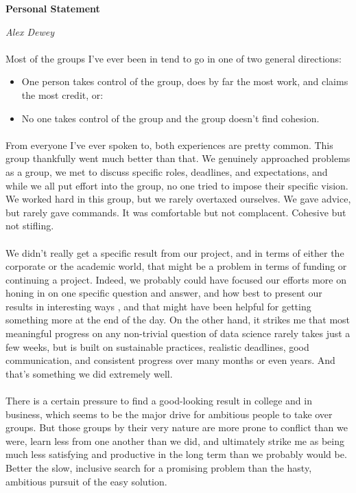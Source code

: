 \documentclass[11pt]{article} %
\begin{document}
\newpage



\textbf{Personal Statement}

\textit{Alex Dewey}

\paragraph{}Most of the groups I've ever been in tend to go in one of two general directions:

\begin{itemize}
\item One person takes control of the group, does by far the most work, and claims the most credit, or:
\item No one takes control of the group and the group doesn't find cohesion.
\end{itemize}

\paragraph{}From everyone I've ever spoken to, both experiences are pretty common. This group thankfully went much better than that. We genuinely approached problems as a group, we met to discuss specific roles, deadlines, and expectations, and while we all put effort into the group, no one tried to impose their specific vision.  We worked hard in this group, but we rarely overtaxed ourselves. We gave advice, but rarely gave commands. It was comfortable but not complacent. Cohesive but not stifling.

\paragraph{}We didn't really get a specific result from our project, and in terms of either the corporate or the academic world, that might be a problem in terms of funding or continuing a project. Indeed, we probably could have focused our efforts more on honing in on one specific question and answer, and how best to present our results in interesting ways , and that might have been helpful for getting something more at the end of the day. On the other hand, it strikes me that most meaningful progress on any non-trivial question of data science rarely takes just a few weeks, but is built on sustainable practices, realistic deadlines, good communication, and consistent progress over many months or even years. And that's something we did extremely well.

\paragraph{}There is a certain pressure to find a good-looking result in college and in business, which seems to be the major drive for ambitious people to take over groups. But those groups by their very nature are more prone to conflict than we were, learn less from one another than we did, and ultimately strike me as being much less satisfying and productive in the long term than we probably would be. Better the slow, inclusive search for a promising problem than the hasty, ambitious pursuit of the easy solution.
\end{document}
